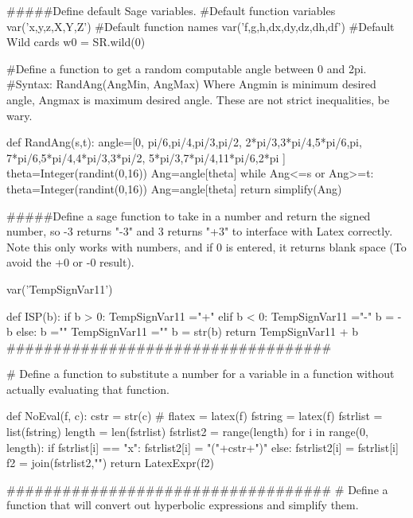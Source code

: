 
\begin{sagesilent}
#####Define default Sage variables.
#Default function variables
var('x,y,z,X,Y,Z')
#Default function names
var('f,g,h,dx,dy,dz,dh,df')
#Default Wild cards
w0 = SR.wild(0)


#Define a function to get a random computable angle between 0 and 2pi. 
#Syntax: RandAng(AngMin, AngMax) Where Angmin is minimum desired angle, Angmax is maximum desired angle. These are not strict inequalities, be wary.

def RandAng(s,t):
   angle=[0, pi/6,pi/4,pi/3,pi/2, 2*pi/3,3*pi/4,5*pi/6,pi, 7*pi/6,5*pi/4,4*pi/3,3*pi/2, 5*pi/3,7*pi/4,11*pi/6,2*pi ]
   theta=Integer(randint(0,16))
   Ang=angle[theta]
   while Ang<=s or Ang>=t:
      theta=Integer(randint(0,16))
      Ang=angle[theta]
   return simplify(Ang)
   
   
#####Define a sage function to take in a number and return the signed number, so -3 returns "-3" and 3 returns "+3" to interface with Latex correctly. Note this only works with numbers, and if 0 is entered, it returns blank space (To avoid the +0 or -0 result).

var('TempSignVar11')

def ISP(b):
   if b > 0:
      TempSignVar11 ="+" 
   elif b < 0:
      TempSignVar11 ="-"
      b = -b
   else:
      b =""
      TempSignVar11 =""
   b = str(b)
   return TempSignVar11 + b
###################################

# Define a function to substitute a number for a variable in a function without actually evaluating that function.

def NoEval(f, c):
    cstr = str(c)
#    flatex = latex(f)
    fstring = latex(f)
    fstrlist = list(fstring)
    length = len(fstrlist)
    fstrlist2 = range(length)
    for i in range(0, length):
        if fstrlist[i] == "x":
            fstrlist2[i] = "("+cstr+")"
        else:
            fstrlist2[i] = fstrlist[i]
    f2 = join(fstrlist2,"")
    return LatexExpr(f2)

###################################
# Define a function that will convert out hyperbolic expressions and simplify them.


\end{sagesilent}
